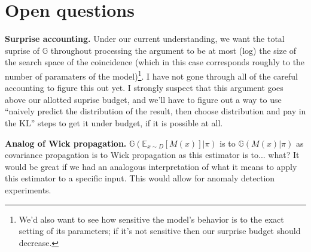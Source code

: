 \documentclass[12pt]{article}
\begin{document}
\section{Open questions}

{\bf Surprise accounting.} Under our current understanding, we want the total suprise of $\mathbb{G}$ throughout processing the argument to be at most (log) the size of the search space of the coincidence (which in this case corresponds roughly to the number of paramaters of the model)\footnote{We'd also want to see how sensitive the model's behavior is to the exact setting of its parameters; if it's not sensitive then our surprise budget should decrease.}. I have not gone through all of the careful accounting to figure this out yet. I strongly suspect that this argument goes above our allotted suprise budget, and we'll have to figure out a way to use ``naively predict the distribution of the result, then choose distribution and pay in the KL'' steps to get it under budget, if it is possible at all.

{\bf Analog of Wick propagation.} $\mathbb{G}(\mathbb{E}_{x \sim D}[M(x)] | \pi)$ is to $\mathbb{G}(M(x) | \pi)$ as covariance propagation is to Wick propagation as this estimator is to... what? It would be great if we had an analogous interpretation of what it means to apply this estimator to a specific input. This would allow for anomaly detection experiments.
\end{document}
